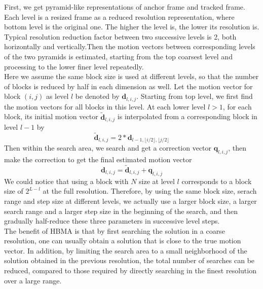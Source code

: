 \documentclass[a4paper, twocolumn]{article}
\begin{document}
	\noindent
	First, we get pyramid-like representations of anchor frame and tracked frame. Each level is a resized frame as  a reduced resolution representation, where bottom level is the original one. The higher the level is, the lower its resolution is. Typical resolution reduction factor between two successive levels is 2, both horizontally and vertically.Then the motion vectors between corresponding levels of the two pyramids is estimated, starting from the top coarsest level and processing to the lower finer level repeatedly.\\
	Here we assume the same block size is used at different levels, so that the number of blocks is reduced by half in each dimension as well. Let the motion vector for block $ (i, j) $ as level $ l $ be denoted by $ \textbf{d}_{l, i, j} $. Starting from top level, we first find the motion vectors for all blocks in this level. At each lower level $ l > 1 $, for each block, its initial motion vector $ \widetilde{\textbf{d}}_{l, i, j} $ is interpolated from a corresponding block in level $ l - 1 $ by 
	\begin{displaymath}
		\widetilde{\textbf{d}}_{l, i, j} = 2*\textbf{d}_{l-1, \lfloor i/2 \rfloor, \lfloor j/2 \rfloor}
	\end{displaymath}
	Then within the search area, we search and get a correction vector $ \textbf{q}_{l, i, j} $, then make the correction to get the final estimated motion vector
	\begin{displaymath}
		\textbf{d}_{l, i, j} = \widetilde{\textbf{d}}_{l, i, j} + \textbf{q}_{l, i, j}
	\end{displaymath}
	We could notice that using a block with $ N $ size at level $ l $ corresponds to a block size of $ 2^{L-l} $ at the full resolution. Therefore, by using the same block size, serach range and step size at different levels, we actually use a larger block size, a larger search range and a larger step size in the beginning of the search, and then gradually half-reduce these three parameters in successive level steps.\\
	The benefit of HBMA is that by first searching the solution in a coarse resolution, one can usually obtain a solution that is close to the true motion vector. In addition, by limiting the search area to a small neighborhood of the solution obtained in the previous resolution, the total number of searches can be reduced, compared to those required by directly searching in the finest resolution over a large range.
	
	
\end{document}
